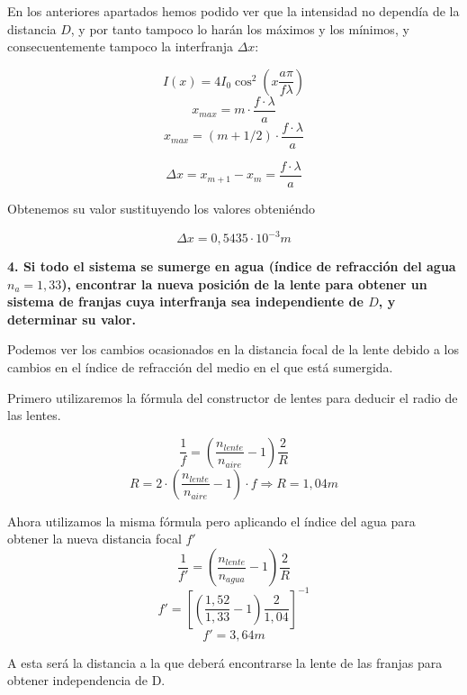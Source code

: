 \documentclass[a4paper,12pt,spanish]{article}
\begin{document}


En los anteriores apartados hemos podido ver que la intensidad no dependía de la distancia $D$, y por tanto tampoco lo harán los máximos y los mínimos, y consecuentemente tampoco la interfranja $\Delta x$:

\[  I(x) = 4 I_0 \cos^2\left(x\frac{a\pi}{f\lambda}\right)
\]
\[ x_{max} = m\cdot\frac{ f \cdot \lambda}{a}
\]
\[ x_{max} = (m+1/2)\cdot\frac{ f \cdot \lambda}{a}
\]

\[ \Delta x = x_{m+1} - x_{m} = \frac{ f \cdot \lambda}{a}
\]

Obtenemos su valor sustituyendo los valores obteniéndo

\[ \boxed{ \Delta x = 0,5435\cdot 10^{-3} \si{m} }
\]

\vspace{\baselineskip}


\textbf{ 4. Si todo el sistema se sumerge en agua (índice de refracción del agua $n_a =
	1,33$), encontrar la nueva posición de la lente para obtener un sistema de
	franjas cuya interfranja sea independiente de $D$, y determinar su valor.
}
\vspace{\baselineskip}

Podemos ver los cambios ocasionados en la distancia focal de la lente debido a los cambios en el índice de refracción del medio en el que está sumergida. 

Primero utilizaremos la fórmula del constructor de lentes para deducir el radio de las lentes.

\[ \frac{1}{f} = \left(\frac{n_{lente}}{n_{aire}} -1\right)\frac{2}{R} \]
\[ R = 2\cdot\left(\frac{n_{lente}}{n_{aire}} -1\right)  \cdot f \Longrightarrow  R = 1,04 \si{m}
\]

Ahora utilizamos la misma fórmula pero aplicando el índice del agua para obtener la nueva distancia focal $f'$
\[ \frac{1}{f'} = \left(\frac{n_{lente}}{n_{agua}} -1\right)\frac{2}{R} \]
\[ f' = \left[ \left(\frac{1,52}{1,33}-1\right) \frac{2}{1,04} \right]^{-1}
\]
\[ \boxed{ f' = 3,64 \si{m}}
\]

A esta será la distancia a la que deberá encontrarse la lente de las franjas para obtener independencia de D.
\end{document}
